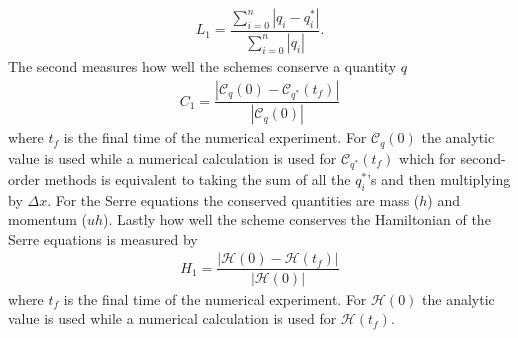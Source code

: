 \documentclass[SingleSpace,12pt,Journal]{Serre_ASCE}
\begin{document}
\begin{gather}
L_1 = \dfrac{\sum_{i = 0}^{n} \left| q_i - q^*_i\right|}{\sum_{i = 0}^{n} \left| q_i\right|}.
\end{gather}
The second measures how well the schemes conserve a quantity $q$
\begin{gather}
C_1 = \dfrac{\left| \mathcal{C}_q(0) - \mathcal{C}_{q^*}(t_f) \right|}{\left| \mathcal{C}_q(0) \right|}
\end{gather}
where $t_f$ is the final time of the numerical experiment. For $\mathcal{C}_q(0)$ the analytic value is used while a numerical calculation is used for $\mathcal{C}_{q^*}(t_f)$ which for second-order methods is equivalent to taking the sum of all the $q^*_i$'s and then multiplying by $\Delta x$. For the Serre equations the conserved quantities are mass ($h$) and momentum ($uh$). Lastly how well the scheme conserves the Hamiltonian of the Serre equations is measured by 
\begin{gather}
H_1 = \dfrac{\left| \mathcal{H}(0) - \mathcal{H}(t_f) \right|}{\left| \mathcal{H}(0) \right|}
\end{gather}
where $t_f$ is the final time of the numerical experiment. For $\mathcal{H}(0)$ the analytic value is used while a numerical calculation is used for $\mathcal{H}(t_f)$.
%
\end{document}
